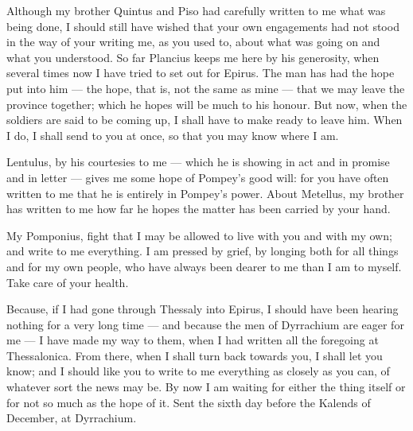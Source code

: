 

 Although my brother Quintus and Piso had carefully written to me what was being done, I should still have wished that your own engagements had not stood in the way of your writing me, as you used to, about what was going on and what you understood. So far Plancius keeps me here by his generosity, when several times now I have tried to set out for Epirus. The man has had the hope put into him --- the hope, that is, not the same as mine --- that we may leave the province together; which he hopes will be much to his honour. But now, when the soldiers are said to be coming up, I shall have to make ready to leave him. When I do, I shall send to you at once, so that you may know where I am.

 Lentulus, by his courtesies to me --- which he is showing in act and in promise and in letter --- gives me some hope of Pompey's good will: for you have often written to me that he is entirely in Pompey's power. About Metellus, my brother has written to me how far he hopes the matter has been carried by your hand.

 My Pomponius, fight that I may be allowed to live with you and with my own; and write to me everything. I am pressed by grief, by longing both for all things and for my own people, who have always been dearer to me than I am to myself. Take care of your health.

 Because, if I had gone through Thessaly into Epirus, I should have been hearing nothing for a very long time --- and because the men of Dyrrachium are eager for me --- I have made my way to them, when I had written all the foregoing at Thessalonica. From there, when I shall turn back towards you, I shall let you know; and I should like you to write to me everything as closely as you can, of whatever sort the news may be. By now I am waiting for either the thing itself or for not so much as the hope of it. Sent the sixth day before the Kalends of December, at Dyrrachium.

